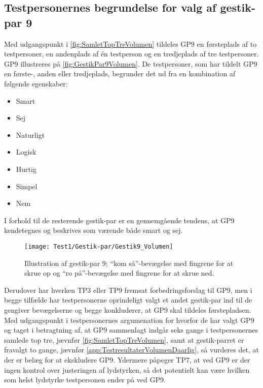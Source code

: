 \subsection{Testpersonernes begrundelse for valg af gestik-par 9}
\label{TestresultaterValgAfGestikkerBegrundelseGP9Volumen}
% 
Med udgangspunkt i \autoref{fig:SamletTopTreVolumen} tildeles GP9 en førsteplads af to testpersoner, en andenplads af én testperson og en tredjeplads af tre testpersoner. GP9 illustreres på \autoref{fig:GestikPar9Volumen}. De testpersoner, som har tildelt GP9 en første-, anden eller tredjeplads, begrunder det ud fra en kombination af følgende egenskaber: 
%
\begin{multicols}{3}
    \begin{itemize}
        \item Smart
        \item Sej
        \item Naturligt
        \item Logisk
        \item Hurtig
        \item Simpel 
        \item Nem
\end{itemize}
\end{multicols}
\noindent
%  
I forhold til de resterende gestik-par er en gennemgående tendens, at GP9 kendetegnes og beskrives som værende både smart og sej.
%
\begin{figure}[H]
	\centering
	\texttt{[image: Test1/Gestik-par/Gestik9\_Volumen]}
	\caption{Illustration af gestik-par 9; \enquote{kom så}-bevægelse med fingrene for at skrue op og \enquote{ro på}-bevægelse med fingrene for at skrue ned.}
		\label{fig:GestikPar9Volumen}
\end{figure}
\noindent
%
Derudover har hverken TP3 eller TP9 fremsat forbedringsforslag til GP9, men i begge tilfælde har testpersonerne oprindeligt valgt et andet gestik-par ind til de gengiver bevægelserne og begge konkluderer, at GP9 skal tildeles førstepladsen.\blankline
%    
Med udgangspunkt i testpersonernes argumenation for hvorfor de har valgt GP9 og taget i betragtning af, at GP9 sammenlagt indgår seks gange i testpersonernes samlede top tre, jævnfør \autoref{fig:SamletTopTreVolumen}, samt at gestik-parret er fravalgt to gange, jævnfør \autoref{app:TestresultaterVolumenDaarlig}, så vurderes det, at der er belæg for at ekskludere GP9. Ydermere påpeger TP7, at ved GP9 er der ingen kontrol over justeringen af lydstyrken, så det potentielt kan være hvilken som helst lydstyrke testpersonen ender på ved GP9. 
%
